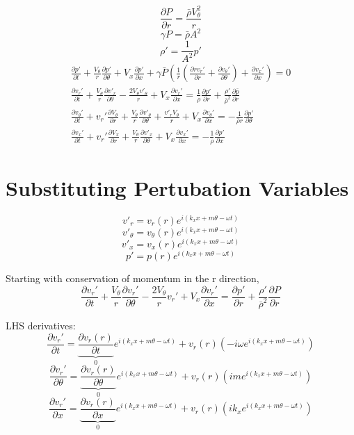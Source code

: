 \documentclass[12pt]{article}
\begin{document}
\[\frac{\partial P}{\partial r} = \frac{\bar{\rho} V_{\theta}^2}{r} \]
\[\gamma P  = \bar{\rho}A^2\]
\[\rho' = \frac{1}{A^2} p'\]
\begin{align*}
\frac{\partial p'}{\partial t} +
\frac{V_{\theta}}{r}
\frac{\partial p'}{\partial \theta} + 
V_x
\frac{\partial p'}{\partial x} +
\gamma\bar{P}
\left(
\frac{1}{r}
\left(
\frac{\partial r v_r'}{\partial r} + \frac{\partial v_{\theta}'}{\partial \theta}		 
\right) +
\frac{\partial v_x'}{\partial x}
\right)= 0\\
\frac{\partial  v_r' }{\partial t} +
\frac{V_{\theta}}{r} \frac{\partial v'_r}{\partial \theta} -
\frac{2V_{\theta}v'_{\theta}}{r} +
V_x \frac{\partial v_r'}{\partial x} =\frac{1    }{\bar{\rho}}  \frac{\partial p'}{\partial r} +
\frac{\rho'}{\bar{\rho}^2}\frac{\partial \bar{p}}{\partial r}\\
\frac{\partial  v_{\theta}' }{\partial t} +
v_r' \frac{\partial  V_{\theta}  }{\partial r} +
\frac{V_{\theta}}{r} \frac{\partial v'_{\theta}}{\partial \theta} +
\frac{v'_rV_{\theta}}{r} +
V_x \frac{\partial v_{\theta}'}{\partial x} 
= -\frac{1}{\bar{\rho} r}	\frac{\partial p'}{\partial \theta}\\
\frac{\partial  v_x' }{\partial t} +
v_r' \frac{\partial  V_x  }{\partial r} +
\frac{V_{\theta}}{r} \frac{\partial v'_x}{\partial \theta} +
V_x \frac{\partial v_x'}{\partial x} 
= -\frac{1    }{\bar{\rho}}  \frac{\partial p'}{\partial x} 	
\end{align*}
\section{Substituting Pertubation Variables}
\[v'_r = v_r (r) e^{i\left(k_x x + m \theta - \omega t \right)} \]
\[v'_{\theta} = v_{\theta} (r) e^{i\left(k_x x + m \theta - \omega t \right)} \]	
\[v'_x = v_x (r) e^{i\left(k_x x + m \theta - \omega t\right)} \]	
\[p' = p(r) e^{i\left(k_x x + m \theta - \omega t\right)} \]	

Starting with conservation of momentum in the r direction,
\[
\frac{\partial v_r'}{\partial t} +
\frac{V_{\theta}}{r} \frac{\partial v_r'}{\partial \theta} - \frac{2V_{\theta}}{r}v_r' + V_x\frac{\partial v_r'}{\partial x} = \frac{\partial p'}{\partial r} + \frac{\rho'}{\bar{\rho}^2}\frac{\partial P}{\partial r}
\]

LHS derivatives:
\[\frac{\partial v_r'}{\partial t} =
 \underbrace{\frac{\partial v_r(r)}{\partial t}}_{0} e^{i\left(k_x x + m \theta - \omega t \right)} +
  v_r(r) \left(-i\omega e^{i\left(k_x x + m \theta - \omega t \right)}\right) \]
\[\frac{\partial v_r'}{\partial \theta} = 
\underbrace{\frac{\partial v_r(r)}{\partial \theta}}_{0} e^{i\left(k_x x + m \theta - \omega t \right)} + v_r(r) \left(im e^{i\left(k_x x + m \theta - \omega t \right)}\right) \]
\[\frac{\partial v_r'}{\partial x} = \underbrace{\frac{\partial v_r(r)}{\partial x}}_{0} e^{i\left(k_x x + m \theta - \omega t \right)} + v_r(r) \left(ik_x e^{i\left(k_x x + m \theta - \omega t \right)}\right) \]
\end{document}
